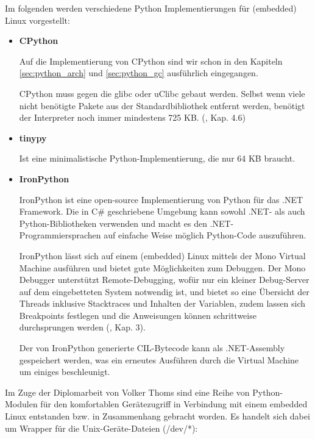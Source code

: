 Im folgenden werden verschiedene Python Implementierungen für (embedded) Linux
vorgestellt:


\begin{itemize}

  \item \textbf{CPython}

        Auf die Implementierung von CPython sind wir schon in den Kapiteln
        \ref{sec:python_arch} und \ref{sec:python_gc} ausführlich eingegangen.

        CPython muss gegen die glibc oder uClibc gebaut werden. Selbst wenn
        viele nicht benötigte Pakete aus der Standardbibliothek entfernt
        werden, benötigt der Interpreter noch immer mindestens 725 KB.
        (\cite{embeddedlinux}, Kap. 4.6)

  \item \textbf{tinypy}

        Ist eine minimalistische Python-Implementierung, die nur 64 KB braucht.\cite{tinypy}

  \item \textbf{IronPython}

        IronPython ist eine open-source Implementierung von Python für das
        .NET Framework. Die in C\# geschriebene Umgebung kann sowohl .NET-
        als auch Python-Bibliotheken verwenden und macht es den
        .NET-Programmiersprachen auf einfache Weise möglich Python-Code
        auszuführen.

        IronPython lässt sich auf einem (embedded) Linux mittels der Mono
        Virtual Machine ausführen und bietet gute Möglichkeiten zum Debuggen.
        Der Mono Debugger unterstützt Remote-Debugging, wofür nur ein kleiner
        Debug-Server auf dem eingebetteten System notwendig ist, und bietet so
        eine Übersicht der Threads inklusive Stacktraces und Inhalten der
        Variablen, zudem lassen sich Breakpoints festlegen und die Anweisungen
        können schrittweise durchsprungen werden (\cite{ironpython}, Kap. 3).

        Der von IronPython generierte CIL-Bytecode kann als .NET-Assembly
        gespeichert werden, was ein erneutes Ausführen durch die Virtual
        Machine um einiges beschleunigt.

\end{itemize}


Im Zuge der Diplomarbeit von Volker Thoms \cite{dipl} sind eine Reihe von
Python-Modulen für den komfortablen Gerätezugriff in Verbindung mit einem
embedded Linux entstanden bzw. in Zusammenhang gebracht worden. Es handelt sich dabei
um Wrapper für die Unix-Geräte-Dateien (/dev/*):


